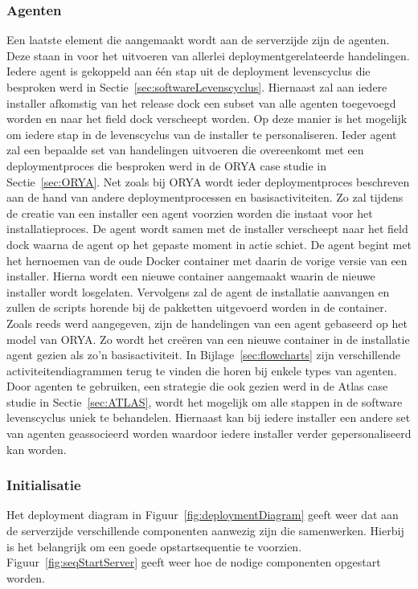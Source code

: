 \subsubsection{Agenten}
Een laatste element die aangemaakt wordt aan de serverzijde zijn de agenten.
Deze staan in voor het uitvoeren van allerlei deploymentgerelateerde handelingen.
Iedere agent is gekoppeld aan één stap uit de deployment levenscyclus die besproken werd in Sectie~\ref{sec:softwareLevenscyclus}.
Hiernaast zal aan iedere installer afkomstig van het release dock een subset van alle agenten toegevoegd worden en naar het field dock verscheept worden.
Op deze manier is het mogelijk om iedere stap in de levenscyclus van de installer te personaliseren.
Ieder agent zal een bepaalde set van handelingen uitvoeren die overeenkomt met een deploymentproces die besproken werd in de ORYA case studie in Sectie~\ref{sec:ORYA}.
Net zoals bij ORYA wordt ieder deploymentproces beschreven aan de hand van andere deploymentprocessen en basisactiviteiten.
Zo zal tijdens de creatie van een installer een agent voorzien worden die instaat voor het installatieproces.
De agent wordt samen met de installer verscheept naar het field dock waarna de agent op het gepaste moment in actie schiet.
De agent begint met het hernoemen van de oude Docker container met daarin de vorige versie van een installer.
Hierna wordt een nieuwe container aangemaakt waarin de nieuwe installer wordt losgelaten.
Vervolgens zal de agent de installatie aanvangen en zullen de scripts horende bij de pakketten uitgevoerd worden in de container.
Zoals reeds werd aangegeven, zijn de handelingen van een agent gebaseerd op het model van ORYA.
Zo wordt het creëren van een nieuwe container in de installatie agent gezien als zo'n basisactiviteit.
In Bijlage~\ref{sec:flowcharts} zijn verschillende activiteitendiagrammen terug te vinden die horen bij enkele types van agenten.
Door agenten te gebruiken, een strategie die ook gezien werd in de Atlas case studie in Sectie~\ref{sec:ATLAS}, wordt het mogelijk om alle stappen in de software levenscyclus uniek te behandelen.
Hiernaast kan bij iedere installer een andere set van agenten geassocieerd worden waardoor iedere installer verder gepersonaliseerd kan worden.

\subsubsection{Initialisatie}\label{sec:initServer}
Het deployment diagram in Figuur~\ref{fig:deploymentDiagram} geeft weer dat aan de serverzijde verschillende componenten aanwezig zijn die samenwerken.
Hierbij is het belangrijk om een goede opstartsequentie te voorzien.
Figuur~\ref{fig:seqStartServer} geeft weer hoe de nodige componenten opgestart worden.


